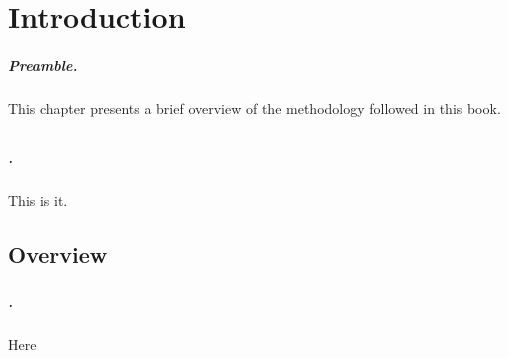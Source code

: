\chapter{Introduction}

\paragraph{Preamble.}
This chapter presents a brief overview of the methodology followed in
this book.
\section{}

\subsection{}

\subsubsection{}

\paragraph{.}
This is it.



\section{Overview}

\subsection{}

\subsubsection{}

\paragraph{.}
Here



\subsection{}

\subsubsection{}

